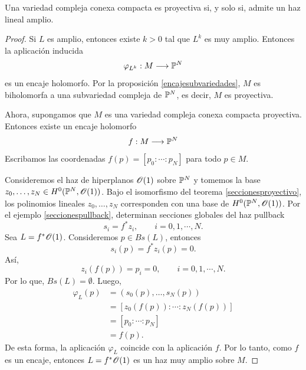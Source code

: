	\begin{theorem}\label{proyectivossiamplio}
		Una variedad compleja conexa compacta es proyectiva si, y solo si, admite un haz lineal amplio.
	\end{theorem}
	\begin{proof}
		Si $L$ es amplio, entonces existe $k>0$ tal que $L^k$ es muy amplio. Entonces la aplicación inducida 
		\begin{equation*}
			\varphi_{L^k}:M\longrightarrow \mathbb{P}^N
		\end{equation*}
		es un encaje holomorfo. Por la proposición \ref{encajesubvariedades}, $M$ es biholomorfa a una subvariedad compleja de $\mathbb{P}^N$, es decir, $M$ es proyectiva.
		
		
		Ahora, supongamos que $M$ es una variedad compleja conexa compacta proyectiva. Entonces existe un encaje holomorfo
		\begin{equation*}
			f:M\longrightarrow\mathbb{P}^N
		\end{equation*}
		Escribamos las coordenadas $f(p)=[p_0:\cdots:p_N]$ para todo $p\in M$.
		
		Consideremos el haz de hiperplanos $\mathscr{O}(1)$ sobre $\mathbb{P}^N$ y tomemos la base $z_0,\dots,z_N\in H^0(\mathbb{P}^N,\mathscr{O}(1))$. Bajo el isomorfismo del teorema \ref{seccionesproyectivo}, los polinomios lineales $z_0,\dots,z_N$ corresponden con una base de $H^0(\mathbb{P}^N,\mathscr{O}(1))$. Por el ejemplo \ref{seccionespullback}, determinan secciones globales del haz pullback
		\begin{equation*}
			s_i=f^*z_i,\qquad i=0,1,\cdots, N.
		\end{equation*}
		Sea $L=f^*\mathscr{O}(1)$. Consideremos $p\in Bs(L)$, entonces
		\begin{equation*}
			s_i(p)=f^*z_i(p)=0.
		\end{equation*}
		Así,
		\begin{equation*}
			z_i(f(p))=p_i=0,\qquad i=0,1,\cdots, N.
		\end{equation*}
		Por lo que, $Bs(L)=\emptyset$. Luego, 
		\begin{align*}
			\varphi_L(p)&=(s_0(p),\dots,s_N(p))\\
			&=[z_0(f(p)):\cdots:z_N(f(p))]\\
			&=[p_0:\cdots:p_N]\\
			&=f(p).
		\end{align*}
		De esta forma, la aplicación $\varphi_L$ coincide con la aplicación $f$. Por lo tanto, como $f$ es un encaje, entonces $L=f^*\mathscr{O}(1)$ es un haz muy amplio sobre $M$.
	\end{proof}
    
